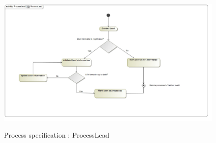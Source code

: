\documentclass{article}
\begin{document}
		\begin{figure}[H]
		\includegraphics[width=18cm]{images/marketingProcess.jpg}  \\
		\caption{Process specification : ProcessLead}
		\end{figure}

		




		
		
		


\end{document}
